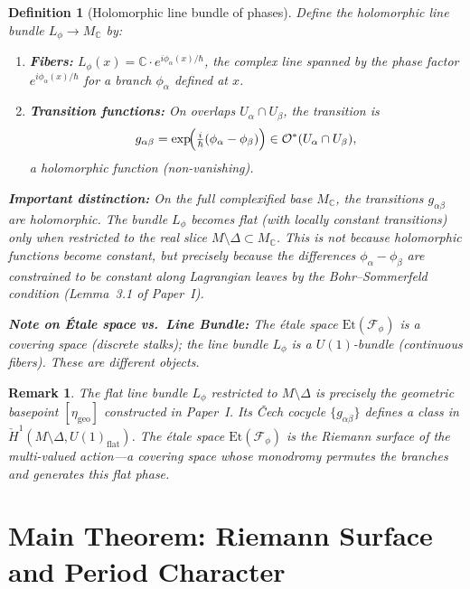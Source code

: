 \documentclass[11pt]{article}
\newtheorem{definition}[theorem]{Definition}
\newtheorem{remark}[theorem]{Remark}
\begin{document}
\begin{definition}[Holomorphic line bundle of phases]
\label{def:phase-bundle}
Define the holomorphic line bundle $L_\phi \to M_\mathbb{C}$ by:
\begin{enumerate}
  \item \textbf{Fibers:} $L_\phi(x) = \mathbb{C} \cdot e^{i\phi_\alpha(x)/\hbar}$, the complex line spanned by the phase factor $e^{i\phi_\alpha(x)/\hbar}$ for a branch $\phi_\alpha$ defined at $x$.

  \item \textbf{Transition functions:} On overlaps $U_\alpha \cap U_\beta$,
        the transition is
        \[
          g_{\alpha\beta} = \exp\!\Bigl(\tfrac{i}{\hbar}(\phi_\alpha - \phi_\beta)\Bigr)
          \in \mathcal{O}^*(U_\alpha \cap U_\beta),
        \]
        a holomorphic function (non-vanishing).
\end{enumerate}

\textbf{Important distinction:} On the full complexified base $M_\mathbb{C}$,
the transitions $g_{\alpha\beta}$ are \emph{holomorphic}. The bundle $L_\phi$ becomes flat (with locally constant transitions) only when restricted to the real slice $M \setminus \Delta \subset M_\mathbb{C}$. This is \emph{not} because holomorphic functions become constant, but precisely because the differences $\phi_\alpha - \phi_\beta$ are constrained to be constant along Lagrangian leaves by the Bohr--Sommerfeld condition (Lemma~3.1 of Paper~I).

\textbf{Note on \'Etale space vs.~Line Bundle:} The \'etale space $\mathrm{Et}(\mathcal{F}_\phi)$ is a covering space (discrete stalks); the line bundle $L_\phi$ is a $U(1)$-bundle (continuous fibers). These are different objects.
\end{definition}

\begin{remark}
The flat line bundle $L_\phi$ restricted to $M \setminus \Delta$ is precisely the
\emph{geometric basepoint} $[\eta_{\mathrm{geo}}]$ constructed in Paper~I. Its Čech cocycle $\{g_{\alpha\beta}\}$ defines a class
in $\check{H}^1(M \setminus \Delta, U(1)_{\mathrm{flat}})$. The étale space $\mathrm{Et}(\mathcal{F}_\phi)$
is the Riemann surface of the multi-valued action---a covering space whose
monodromy permutes the branches and generates this flat phase.
\end{remark}

\section{Main Theorem: Riemann Surface and Period Character}
\label{sec:main}
\end{document}
